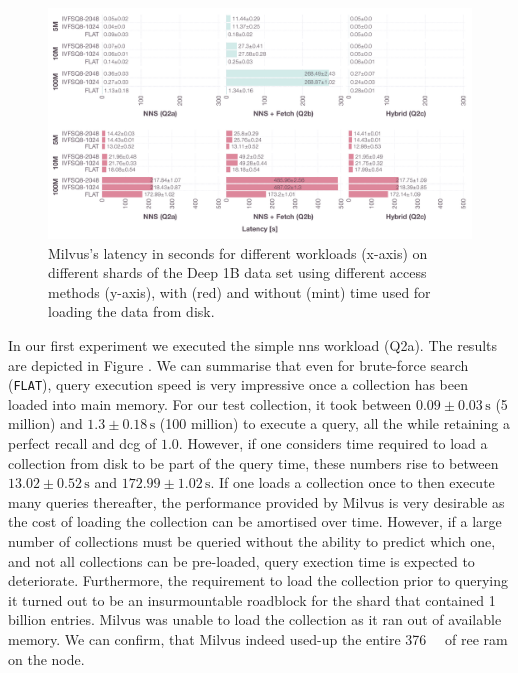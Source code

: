 \begin{landscape}
    \begin{figure}[p]
        \includegraphics[width=1.6\textwidth]{figures/bignns/milvus/bignns-milvus}
        \caption{Milvus's latency in seconds for different workloads (x-axis) on different shards of the Deep 1B data set using different access methods (y-axis), with (red) and without (mint) time used for loading the data from disk.}
        \label{figure:milvus_runtime}
    \end{figure}
\end{landscape}

In our first experiment we executed the simple \acrshort{nns} workload (Q2a). The results are depicted in Figure . We can summarise that even for brute-force search (\texttt{FLAT}), query execution speed is very impressive once a collection has been loaded into main memory. For our test collection, it took between $0.09 \pm 0.03 \, \si{\second}$ (5 million) and $1.3 \pm 0.18 \, \si{\second}$ (100 million) to execute a query, all the while retaining a perfect recall and \acrshort{dcg} of $1.0$. However, if one considers time required to load a collection from disk to be part of the query time, these numbers rise to between $13.02 \pm 0.52 \, \si{\second}$ and $172.99 \pm 1.02 \, \si{\second}$. If one loads a collection once to then execute many queries thereafter, the performance provided by Milvus is very desirable as the cost of loading the collection can be amortised over time. However, if a large number of collections must be queried without the ability to predict which one, and not all collections can be pre-loaded, query exection time is expected to deteriorate. Furthermore, the requirement to load the collection prior to querying it turned out to be an insurmountable roadblock for the shard that contained 1 billion entries. Milvus was unable to load the collection as it ran out of available memory. We can confirm, that Milvus indeed used-up the entire \SI{376}{\giga\byte} of ree \acrshort{ram} on the node.

